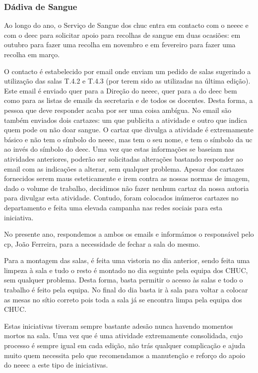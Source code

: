 
\subsubsection{Dádiva de Sangue}

Ao longo do ano, o Serviço de Sangue dos \acrshort{chuc} entra em contacto com o \acrshort{neeec} e com o \acrshort{deec} para solicitar apoio para recolhas de sangue em duas ocasiões: em outubro para fazer uma recolha em novembro e em fevereiro para fazer uma recolha em março.

O contacto é estabelecido por email onde enviam um pedido de salas sugerindo a utilização das salas T.4.2 e T.4.3 (por terem sido as utilizadas na última edição). Este email é enviado quer para a Direção do \acrshort{neeec}, quer para a do \acrshort{deec} bem como para as listas de emails da secretaria e de todos os docentes. Desta forma, a pessoa que deve responder acaba por ser uma coisa ambígua. No email são também enviados dois cartazes: um que publicita a atividade e outro que indica quem pode ou não doar sangue. O cartaz que divulga a atividade é extremamente básico e não tem o símbolo do \acrshort{neeec}, mas tem o seu nome, e tem o símbolo da \acrshort{uc} ao invés do símbolo do \acrshort{deec}. Uma vez que estas informações se baseiam nas atividades anteriores, poderão ser solicitadas alterações bastando responder ao email com as indicações a alterar, sem qualquer problema. Apesar dos cartazes fornecidos serem maus esteticamente e irem contra as nossas normas de imagem, dado o volume de trabalho, decidimos não fazer nenhum cartaz da nossa autoria para divulgar esta atividade. Contudo, foram colocados inúmeros cartazes no departamento e feita uma elevada campanha nas redes sociais para esta iniciativa.

No presente ano, respondemos a ambos os emails e informámos o responsável pelo \acrlong{cp}, João Ferreira, para a necessidade de fechar a sala do mesmo.

Para a montagem das salas, é feita uma vistoria no dia anterior, sendo feita uma limpeza à sala e tudo o resto é montado no dia seguinte pela equipa dos CHUC, sem qualquer problema. Desta forma, basta permitir o acesso às salas e todo o trabalho é feito pela equipa. No final do dia basta ir à sala para voltar a colocar as mesas no sítio correto pois toda a sala já se encontra limpa pela equipa dos CHUC.

Estas iniciativas tiveram sempre bastante adesão nunca havendo momentos mortos na sala. Uma vez que é uma atividade extremamente consolidada, cujo processo é sempre igual em cada edição, não trás qualquer complicação e ajuda muito quem necessita pelo que recomendamos a manutenção e reforço do apoio do \acrshort{neeec} a este tipo de iniciativas.
